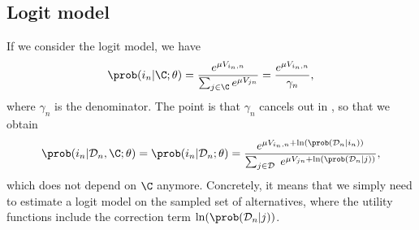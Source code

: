 \documentclass[12pt,a4paper]{article}
\begin{document}
\subsection{Logit model}
If we consider the logit model, we have
\[
\prob(i_n | \C; \theta) = \frac{e^{\mu V_{i_n,n}}}{\sum_{j\in\C} e^{\mu V_{jn}}} = \frac{e^{\mu V_{i_n,n}}}{\gamma_n},
\]
where $\gamma_n$ is the denominator. The point is that $\gamma_n$ cancels out in , so that we obtain
\begin{equation}
  \label{eq:logit}
  \prob(i_n | \mathcal{D}_n, \C; \theta) = \prob(i_n | \mathcal{D}_n; \theta) =\frac{e^{\mu V_{i_n,n} + \ln(\prob(\mathcal{D}_n | i_n) )} }{\sum_{j\in\mathcal{D}} \; e^{\mu V_{jn}+ \ln(\prob(\mathcal{D}_n | j))}},
    \end{equation}
which does not depend on $\C$ anymore. Concretely, it means that we simply need to estimate a logit model on the sampled set of alternatives, where the utility functions include the correction term $\ln(\prob(\mathcal{D}_n | j))$.
\end{document}
